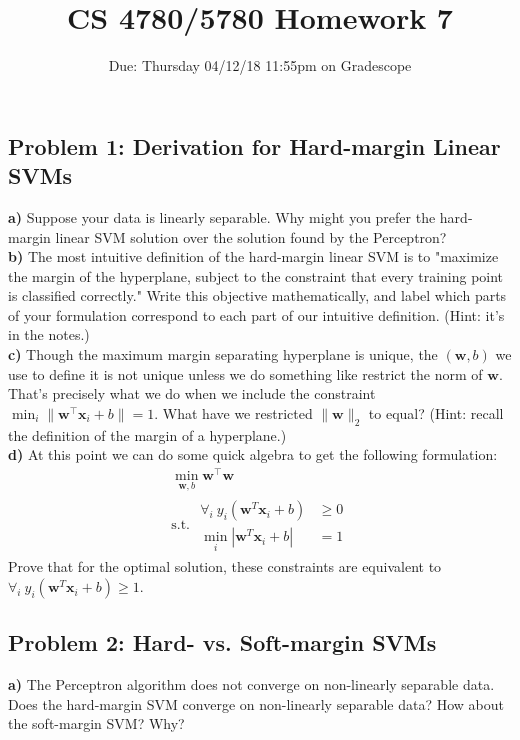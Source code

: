 \documentclass[a4paper]{article}
\title{CS 4780/5780 Homework 7\vspace{-10pt}}
\author{Due: Thursday 04/12/18 11:55pm on Gradescope}
\date{\vspace{-15pt}}
\begin{document}
\maketitle

\subsection*{Problem 1: Derivation for Hard-margin Linear SVMs}
\textbf{a)} Suppose your data is linearly separable. Why might you prefer the hard-margin linear SVM solution over the solution found by the Perceptron?\\

\textbf{b)} The most intuitive definition of the hard-margin linear SVM is to "maximize the margin of the hyperplane, subject to the constraint that every training point is classified correctly." Write this objective mathematically, and label which parts of your formulation correspond to each part of our intuitive definition. (Hint: it's in the notes.)\\

\textbf{c)} Though the maximum margin separating hyperplane is unique, the $(\mathbf{w},b)$ we use to define it is not unique unless we do something like restrict the norm of $\mathbf{w}$. That's precisely what we do when we include the constraint $\min_i\|\mathbf{w}^\top\mathbf{x}_i+b\|=1$. What have we restricted $\|\mathbf{w}\|_2$ to equal? (Hint: recall the definition of the margin of a hyperplane.)\\

\textbf{d)} At this point we can do some quick algebra to get the following formulation:
\begin{align*} &\min_{\mathbf{w},b} \mathbf{w}^\top\mathbf{w} & \\ &\textrm{s.t. } \begin{matrix} \forall_i \ y_{i}(\mathbf{w}^T \mathbf{x}_{i}+b)&\geq 0\\ \min_{i}\left | \mathbf{w}^T \mathbf{x}_{i}+b \right | &= 1 \end{matrix} \end{align*}
Prove that for the optimal solution, these constraints are equivalent to $ \forall_i \ y_{i}(\mathbf{w}^T \mathbf{x}_{i}+b) \geq 1 $.

\subsection*{Problem 2: Hard- vs. Soft-margin SVMs}
\textbf{a)} The Perceptron algorithm does not converge on non-linearly separable data. Does the hard-margin SVM converge on non-linearly separable data? How about the soft-margin SVM? Why?\\
\end{document}
